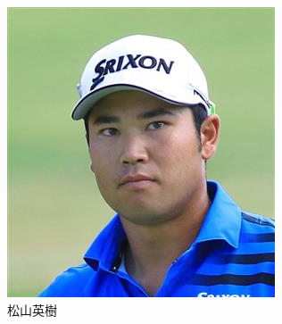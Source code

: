 \documentclass[a4j, twocolumn]{jarticle}
\begin{document}
\begin{figure}[htb]
  \centering
    \begin{subfigure}{0.25\linewidth}
      \includegraphics[width=\linewidth]{matuyama.jpg}
      \caption{松山英樹}\label{matsuyama}
    \end{subfigure}
    \hspace{0.04\linewidth}
    \begin{subfigure}{0.20\linewidth}

\end{subfigure}
\end{figure}
\end{document}
